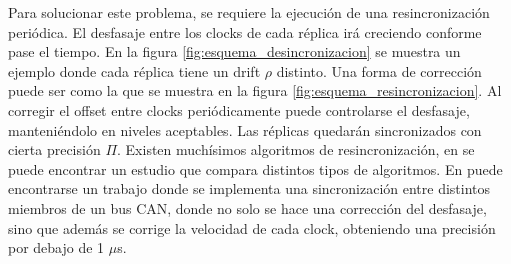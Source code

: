 
Para solucionar este problema, se requiere la ejecución de una resincronización periódica. El desfasaje entre los clocks de cada réplica irá creciendo conforme pase el tiempo. En la figura \ref{fig:esquema_desincronizacion} se muestra un ejemplo donde cada réplica tiene un drift $\rho$ distinto. Una forma de corrección puede ser como la que se muestra en la figura \ref{fig:esquema_resincronizacion}. Al corregir el offset entre clocks periódicamente puede controlarse el desfasaje, manteniéndolo en niveles aceptables. Las réplicas quedarán sincronizados con cierta precisión $\Pi$. Existen muchísimos algoritmos de resincronización, en \cite{anceaume1998performance} se puede encontrar un estudio que compara distintos tipos de algoritmos. En \cite{9501400} puede encontrarse un trabajo donde se implementa una sincronización entre distintos miembros de un bus CAN, donde no solo se hace una corrección del desfasaje, sino que además se corrige la velocidad de cada clock, obteniendo una precisión por debajo de 1 $\mu$s.


